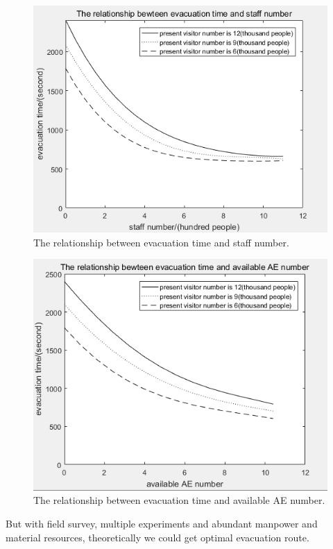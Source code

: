 \documentclass[12pt]{article}
\begin{document}
\begin{figure}[ht]
	\centering
	\includegraphics[scale=0.8]{figure11.png}
	\caption{The relationship between evacuation time and staff number.}
	\label{fig:fig10}
\end{figure}

\begin{figure}[ht]
	\centering
	\includegraphics[scale=0.8]{figure12.png}
	\caption{The relationship between evacuation time and available AE number.}
	\label{fig:fig11}
\end{figure}


But with field survey, multiple experiments and abundant manpower and material 
resources, theoretically we could get optimal evacuation route.
\end{document}
